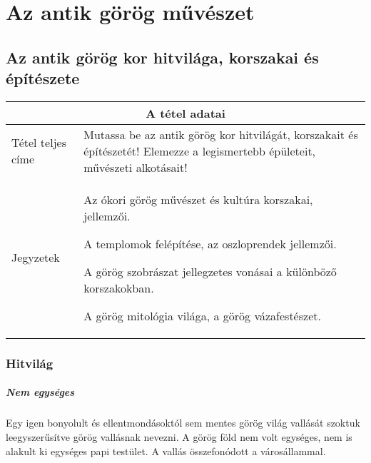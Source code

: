 \chapter{Az antik görög művészet}
\label{ch:2_antik_gorog}

\section{Az antik görög kor hitvilága, korszakai és építészete}

\begin{center}
	\begin{longtable}{ | p{} | p{} | }
		
		\hline
		\multicolumn{2}{|c|}{\textbf{A tétel adatai}}
		\\ \hline
		
		\hline
		Tétel teljes címe & Mutassa be az antik görög kor hitvilágát, korszakait és építészetét! Elemezze a legismertebb épületeit, művészeti alkotásait!
		\\ \hline
		
		Jegyzetek &
		\begin{compactitem}
			\item Az ókori görög művészet és kultúra korszakai, jellemzői.
			\item A templomok felépítése, az oszloprendek jellemzői.
			\item A görög szobrászat jellegzetes vonásai a különböző korszakokban.
			\item A görög mitológia világa, a görög vázafestészet.
		\end{compactitem}
		\\\hline
		
	\end{longtable}
\end{center}

\clearpage

\subsection*{Hitvilág}

\paragraph{Nem egységes} 
Egy igen bonyolult és ellentmondásoktól sem mentes görög világ vallását szoktuk leegyszerűsítve görög vallásnak nevezni. A görög föld nem volt egységes, nem is alakult ki egységes papi testület. A vallás összefonódott a városállammal.

